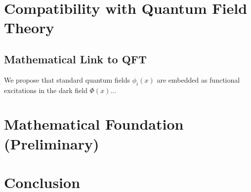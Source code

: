 \documentclass[12pt]{article}
\begin{document}
\section{Compatibility with Quantum Field Theory}
\subsection{Mathematical Link to QFT}
We propose that standard quantum fields $\phi_i(x)$ are embedded as functional excitations in the dark field $\Phi(x)$...

\section{Mathematical Foundation (Preliminary)}

\section{Conclusion}
\end{document}
